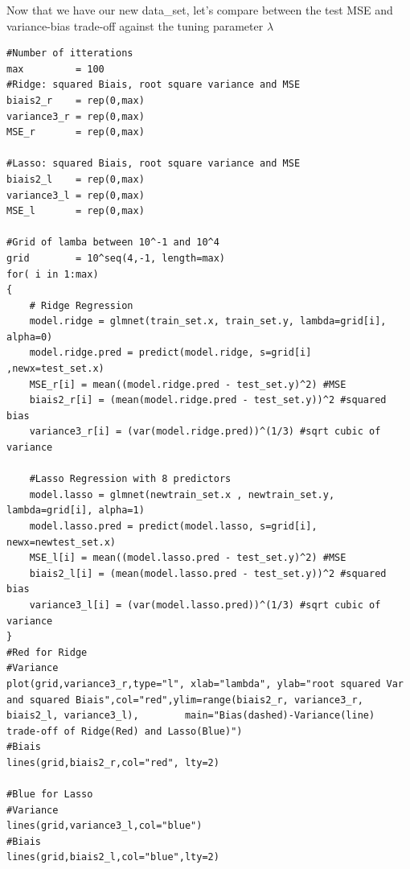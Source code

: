 \documentclass[]{report}
\begin{document}
Now that we have our new data\_set, let's compare between the test MSE and variance-bias trade-off against the tuning parameter $\lambda$
\begin{lstlisting}
#Number of itterations
max         = 100
#Ridge: squared Biais, root square variance and MSE
biais2_r    = rep(0,max)
variance3_r = rep(0,max) 
MSE_r       = rep(0,max)

#Lasso: squared Biais, root square variance and MSE
biais2_l    = rep(0,max)
variance3_l = rep(0,max) 
MSE_l       = rep(0,max)

#Grid of lamba between 10^-1 and 10^4
grid        = 10^seq(4,-1, length=max)
for( i in 1:max)
{    
	# Ridge Regression
	model.ridge = glmnet(train_set.x, train_set.y, lambda=grid[i], alpha=0)
	model.ridge.pred = predict(model.ridge, s=grid[i] ,newx=test_set.x)    
	MSE_r[i] = mean((model.ridge.pred - test_set.y)^2) #MSE
	biais2_r[i] = (mean(model.ridge.pred - test_set.y))^2 #squared bias
	variance3_r[i] = (var(model.ridge.pred))^(1/3) #sqrt cubic of variance

	#Lasso Regression with 8 predictors
	model.lasso = glmnet(newtrain_set.x , newtrain_set.y, lambda=grid[i], alpha=1)
	model.lasso.pred = predict(model.lasso, s=grid[i], newx=newtest_set.x) 
	MSE_l[i] = mean((model.lasso.pred - test_set.y)^2) #MSE
	biais2_l[i] = (mean(model.lasso.pred - test_set.y))^2 #squared bias
	variance3_l[i] = (var(model.lasso.pred))^(1/3) #sqrt cubic of variance   
}
#Red for Ridge
#Variance
plot(grid,variance3_r,type="l", xlab="lambda", ylab="root squared Var and squared Biais",col="red",ylim=range(biais2_r, variance3_r, biais2_l, variance3_l), 		main="Bias(dashed)-Variance(line) trade-off of Ridge(Red) and Lasso(Blue)") 
#Biais
lines(grid,biais2_r,col="red", lty=2)
 
#Blue for Lasso
#Variance
lines(grid,variance3_l,col="blue")
#Biais 
lines(grid,biais2_l,col="blue",lty=2) 
\end{lstlisting}
\end{document}
